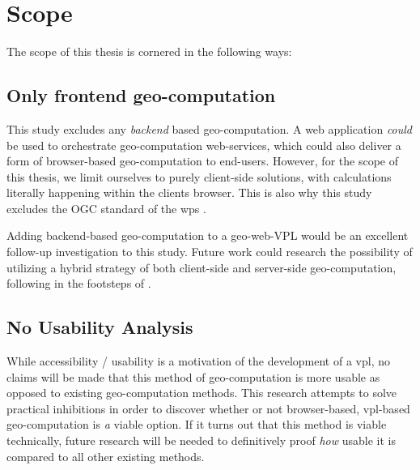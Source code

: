 


\newpage
\section{Scope}
The scope of this thesis is cornered in the following ways: 

\subsection*{Only frontend geo-computation}
This study excludes any \emph {backend} based geo-computation.
A web application \textit{could} be used to orchestrate geo-computation web-services, which could also deliver a form of browser-based geo-computation to end-users. 
However, for the scope of this thesis, we limit ourselves to purely client-side solutions, with calculations literally happening within the clients browser. 
This is also why this study excludes the OGC standard of the \ac{wps} \cite{ogc_web_2015}.

Adding backend-based geo-computation to a geo-web-VPL would be an excellent follow-up investigation to this study. 
Future work could research the possibility of utilizing a hybrid strategy of both client-side and server-side geo-computation, following in the footsteps of \cite{panidi_hybrid_2015}. 

\subsection*{No Usability Analysis} %
While accessibility / usability is a motivation of the development of a \ac{vpl}, no claims will be made that this method of geo-computation is more usable as opposed to existing geo-computation methods. This research attempts to solve practical inhibitions in order to discover whether or not browser-based, vpl-based geo-computation is \emph{a} viable option. If it turns out that this method is viable technically, future research will be needed to definitively proof \emph{how} usable it is compared to all other existing methods.  


